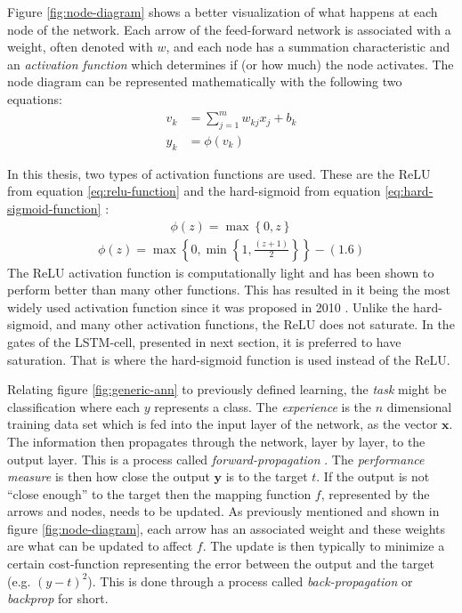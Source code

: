 \documentclass[../main.tex]{subfiles}
\begin{document}
Figure \ref{fig:node-diagram} shows a better visualization of what happens at each node of the network.
Each arrow of the feed-forward network is associated with a weight, often denoted with $w$, and each node has a summation characteristic and an \textit{activation function} which determines if (or how much) the node activates.
The node diagram can be represented mathematically with the following two equations:
\begin{subequations}
\label{eq:ann-node}
\begin{align}
    v_k &= \sum_{j=1}^m w_{kj}x_j + b_k \\
    y_k &= \phi (v_k)
\end{align}
\end{subequations}

In this thesis, two types of activation functions are used.
These are the \ac{ReLU} from equation \ref{eq:relu-function} and the hard-sigmoid from equation \ref{eq:hard-sigmoid-function} \cite{Goodfellow2016, Nwankpa2018}:
\begin{align}
\label{eq:relu-function}
    \phi (z) = \max\left\{0,z\right\}
\end{align}
\begin{align}
\label{eq:hard-sigmoid-function}
    \phi (z) = \max\left\{0,\min\left\{1,\frac{(z+1)}{2}\right\}\right\}-\left(1.6\right)
\end{align}
The \ac{ReLU} activation function is computationally light and has been shown to perform better than many other functions.
This has resulted in it being the most widely used activation function since it was proposed in 2010 \cite{Nwankpa2018}.
Unlike the hard-sigmoid, and many other activation functions, the \ac{ReLU} does not saturate.
In the gates of the \ac{LSTM}-cell, presented in next section, it is preferred to have saturation.
That is where the hard-sigmoid function is used instead of the \ac{ReLU}.

Relating figure \ref{fig:generic-ann} to previously defined learning, the \textit{task} might be classification where each $y$ represents a class.
The \textit{experience} is the $n$ dimensional training data set which is fed into the input layer of the network, as the vector $\mathbf{x}$.
The information then propagates through the network, layer by layer, to the output layer. 
This is a process called \textit{forward-propagation} \cite{Goodfellow2016}.
The \textit{performance measure} is then how close the output $\mathbf{y}$ is to the target $t$.
If the output is not ``close enough'' to the target then the mapping function $f$, represented by the arrows and nodes, needs to be updated.
As previously mentioned and shown in figure \ref{fig:node-diagram}, each arrow has an associated weight and these weights are what can be updated to affect $f$.
The update is then typically to minimize a certain cost-function representing the error between the output and the target (e.g. $(y-t)^2$).
This is done through a process called \textit{back-propagation} or \textit{backprop} for short.
\end{document}
